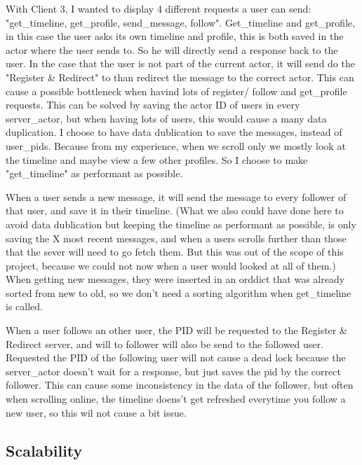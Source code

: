 \documentclass[a4paper]{article}
\begin{document}
With Client 3, I wanted to display 4 different requests a user can send: "get\_timeline, get\_profile, send\_message, follow".
Get\_timeline and get\_profile, in this case the user asks its own timeline and profile, this is both saved in the actor where the user sends to.
So he will directly send a response back to the user.
In the case that the user is not part of the current actor, it will send do the "Register \& Redirect" to than redirect the message to the correct actor.
This can cause a possible bottleneck when havind lots of register/ follow and get\_profile requests.
This can be solved by saving the actor ID of users in every server\_actor, but when having lots of users, this would cause a many data duplication.
I choose to have data dublication to save the messages, instead of user\_pids.
Because from my experience, when we scroll only we mostly look at the timeline and maybe view a few other profiles.
So I choose to make "get\_timeline" as performant as possible. 

When a user sends a new message, it will send the message to every follower of that user, and save it in their timeline. (What we also could have done here to avoid data dublication but keeping the timeline as performant as possible, is only saving the X most recent messages, and when a users scrolls further than those that the sever will need to go fetch them. But this was out of the scope of this project, because we could not now when a user would looked at all of them.) When getting new messages, they were inserted in an orddict that was already sorted from new to old, so we don't need a sorting algorithm when get\_timeline is called.

When a user follows an other user, the PID will be requested to the Register \& Redirect server, and will to follower will also be send to the followed user. 
Requested the PID of the following user will not cause a dead lock because the server\_actor doesn't wait for a response, but just saves the pid by the correct follower. This can cause some inconsistency in the data of the follower, but often when scrolling online, the timeline doens't get refreshed everytime you follow a new user, so this wil not cause a bit issue. 


%

\subsection{Scalability}
\end{document}
